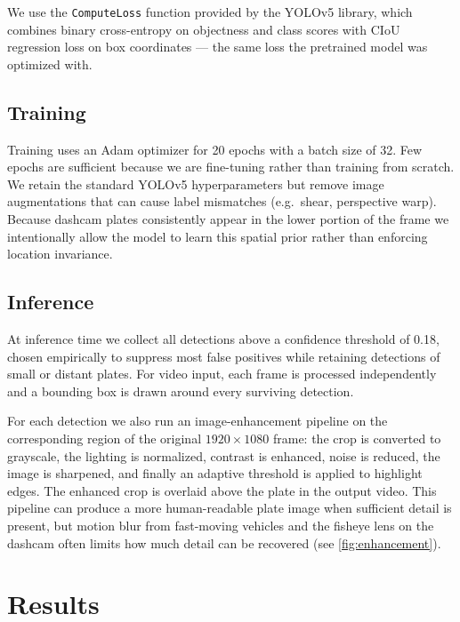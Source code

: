 \documentclass[times,10pt,twocolumn]{article}
\begin{document}
We use the \texttt{ComputeLoss} function provided by the YOLOv5 library, which
combines binary cross-entropy on objectness and class scores with CIoU
regression loss on box coordinates --- the same loss the pretrained model was
optimized with.

\subsection{Training}
\label{sec:training}

Training uses an Adam optimizer for 20 epochs with a batch size of 32.
Few epochs are sufficient because we are fine-tuning rather than training from
scratch.
We retain the standard YOLOv5 hyperparameters but remove image augmentations
that can cause label mismatches (e.g.\ shear, perspective warp).
Because dashcam plates consistently appear in the lower portion of the frame
we intentionally allow the model to learn this spatial prior rather than
enforcing location invariance.

\subsection{Inference}
\label{sec:inference}

At inference time we collect all detections above a confidence threshold of
0.18, chosen empirically to suppress most false positives while retaining
detections of small or distant plates.
For video input, each frame is processed independently and a bounding box is
drawn around every surviving detection.

For each detection we also run an image-enhancement pipeline on the
corresponding region of the original $1920\!\times\!1080$ frame: the crop is
converted to grayscale, the lighting is normalized, contrast is enhanced,
noise is reduced, the image is sharpened, and finally an adaptive threshold is
applied to highlight edges.
The enhanced crop is overlaid above the plate in the output video.
This pipeline can produce a more human-readable plate image when sufficient
detail is present, but motion blur from fast-moving vehicles and the fisheye lens on the dashcam often limits how
much detail can be recovered (see \cref{fig:enhancement}).

\section{Results}
\label{sec:results}
\end{document}
